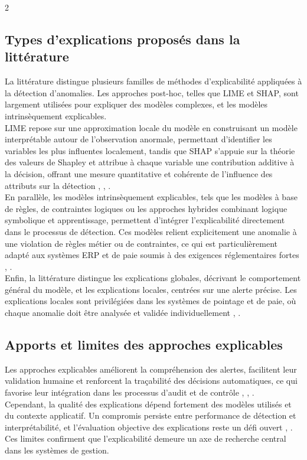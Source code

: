 \documentclass[10pt]{article}
\begin{document}
\begin{multicols}{2}
            \subsection{Types d’explications proposés dans la littérature}
            La littérature distingue plusieurs familles de méthodes d’explicabilité appliquées à la détection d’anomalies. Les approches post-hoc, telles que LIME et SHAP, sont largement utilisées pour expliquer des modèles complexes, et les modèles intrinsèquement explicables.\\
            LIME repose sur une approximation locale du modèle en construisant un modèle interprétable autour de l’observation anormale, permettant d’identifier les variables les plus influentes localement, tandis que SHAP s’appuie sur la théorie des valeurs de Shapley et attribue à chaque variable une contribution additive à la décision, offrant une mesure quantitative et cohérente de l’influence des attributs sur la détection \cite{ref4}, \cite{ref6}, \cite{ref11}.\\
            En parallèle, les modèles intrinsèquement explicables, tels que les modèles à base de règles, de contraintes logiques ou les approches hybrides combinant logique symbolique et apprentissage, permettent d’intégrer l’explicabilité directement dans le processus de détection. Ces modèles relient explicitement une anomalie à une violation de règles métier ou de contraintes, ce qui est particulièrement adapté aux systèmes ERP et de paie soumis à des exigences réglementaires fortes \cite{ref7}, \cite{ref9}.\\
            Enfin, la littérature distingue les explications globales, décrivant le comportement général du modèle, et les explications locales, centrées sur une alerte précise. Les explications locales sont privilégiées dans les systèmes de pointage et de paie, où chaque anomalie doit être analysée et validée individuellement \cite{ref5}, \cite{ref6}.

        \subsection{Apports et limites des approches explicables}
        Les approches explicables améliorent la compréhension des alertes, facilitent leur validation humaine et renforcent la traçabilité des décisions automatiques, ce qui favorise leur intégration dans les processus d’audit et de contrôle \cite{ref5}, \cite{ref11}, \cite{ref3}.\\
        Cependant, la qualité des explications dépend fortement des modèles utilisés et du contexte applicatif. Un compromis persiste entre performance de détection et interprétabilité, et l’évaluation objective des explications reste un défi ouvert \cite{ref5}, \cite{ref6}. Ces limites confirment que l’explicabilité demeure un axe de recherche central dans les systèmes de gestion.


\end{multicols}
\end{document}
